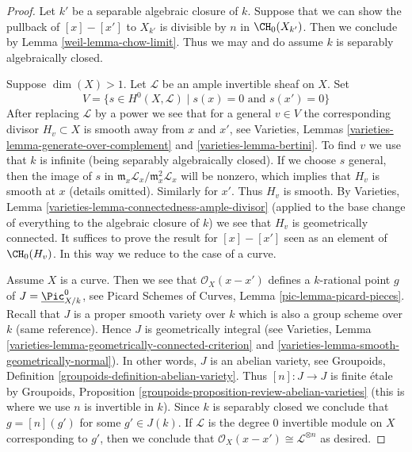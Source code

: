 \begin{proof}

Let $k'$ be a separable algebraic closure of $k$. Suppose that we can show
the pullback of $[x] - [x']$ to $X_{k'}$ is divisible by $n$ in
$\CH_0(X_{k'})$. Then we conclude by Lemma \ref{weil-lemma-chow-limit}.
Thus we may and do assume $k$ is separably algebraically closed.

\medskip\noindent
Suppose $\dim(X) > 1$. Let $\mathcal{L}$ be an ample invertible sheaf on $X$.
Set
$$
V = \{s \in H^0(X, \mathcal{L}) \mid s(x) = 0\text{ and }s(x') = 0 \}
$$
After replacing $\mathcal{L}$ by a power we see that for
a general $v \in V$ the corresponding divisor $H_v \subset X$ is smooth
away from $x$ and $x'$, see
Varieties, Lemmas \ref{varieties-lemma-generate-over-complement} and
\ref{varieties-lemma-bertini}. To find $v$ we use that $k$ is infinite (being
separably algebraically closed).
If we choose $s$ general, then the image of $s$ in
$\mathfrak m_x\mathcal{L}_x/\mathfrak m_x^2\mathcal{L}_x$
will be nonzero, which implies that $H_v$ is smooth at $x$
(details omitted). Similarly for $x'$. Thus $H_v$ is smooth.
By Varieties, Lemma \ref{varieties-lemma-connectedness-ample-divisor}
(applied to the base change of everything
to the algebraic closure of $k$)
we see that $H_v$ is geometrically connected.
It suffices to prove the result for
$[x] - [x']$ seen as an element of $\CH_0(H_v)$.
In this way we reduce to the case of a curve.

\medskip\noindent
Assume $X$ is a curve. Then we see that $\mathcal{O}_X(x - x')$
defines a $k$-rational point $g$ of $J = \underline{\Pic}^0_{X/k}$, see
Picard Schemes of Curves, Lemma \ref{pic-lemma-picard-pieces}.
Recall that $J$ is a proper smooth variety over $k$
which is also a group scheme over $k$ (same reference).
Hence $J$ is geometrically integral
(see Varieties, Lemma \ref{varieties-lemma-geometrically-connected-criterion}
and \ref{varieties-lemma-smooth-geometrically-normal}).
In other words, $J$ is an abelian variety, see
Groupoids, Definition \ref{groupoids-definition-abelian-variety}.
Thus $[n] : J \to J$ is finite \'etale by
Groupoids, Proposition \ref{groupoids-proposition-review-abelian-varieties}
(this is where we use $n$ is invertible in $k$).
Since $k$ is separably closed we conclude that $g = [n](g')$
for some $g' \in J(k)$. If $\mathcal{L}$ is the degree $0$
invertible module on $X$ corresponding to $g'$, then we conclude
that $\mathcal{O}_X(x - x') \cong \mathcal{L}^{\otimes n}$ as desired.
\end{proof}

